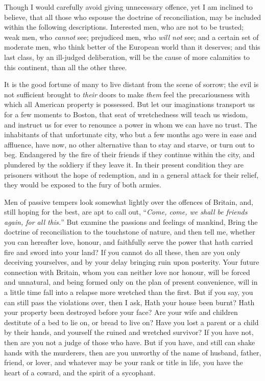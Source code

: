 \documentclass[12pt, twocolumn]{book}
\begin{document}
    Though I would carefully avoid giving unnecessary offence, yet I am inclined to believe, that all those who espouse the doctrine of reconciliation, may be included within the following descriptions. Interested men, who are not to be trusted; weak men, who \textit{cannot} see; prejudiced men, who \textit{will not} see; and a certain set of moderate men, who think better of the European world than it deserves; and this last class, by an ill-judged deliberation, will be the cause of more calamities to this continent, than all the other three.

    It is the good fortune of many to live distant from the scene of sorrow; the evil is not sufficient brought to \textit{their} doors to make \textit{them} feel the precariousness with which all American property is possessed. But let our imaginations transport us for a few moments to Boston, that seat of wretchedness will teach us wisdom, and instruct us for ever to renounce a power in whom we can have no trust. The inhabitants of that unfortunate city, who but a few months ago were in ease and affluence, have now, no other alternative than to stay and starve, or turn out to beg. Endangered by the fire of their friends if they continue within the city, and plundered by the soldiery if they leave it. In their present condition they are prisoners without the hope of redemption, and in a general attack for their relief, they would be exposed to the fury of both armies.

    Men of passive tempers look somewhat lightly over the offences of Britain, and, still hoping for the best, are apt to call out, “\textit{Come, come, we shall be friends again, for all this.}” But examine the passions and feelings of mankind, Bring the doctrine of reconciliation to the touchstone of nature, and then tell me, whether you can hereafter love, honour, and faithfully serve the power that hath carried fire and sword into your land? If you cannot do all these, then are you only deceiving yourselves, and by your delay bringing ruin upon posterity. Your future connection with Britain, whom you can neither love nor honour, will be forced and unnatural, and being formed only on the plan of present convenience, will in a little time fall into a relapse more wretched than the first. But if you say, you can still pass the violations over, then I ask, Hath your house been burnt? Hath your property been destroyed before your face? Are your wife and children destitute of a bed to lie on, or bread to live on? Have you lost a parent or a child by their hands, and yourself the ruined and wretched survivor? If you have not, then are you not a judge of those who have. But if you have, and still can shake hands with the murderers, then are you unworthy of the name of husband, father, friend, or lover, and whatever may be your rank or title in life, you have the heart of a coward, and the spirit of a sycophant.
\end{document}
